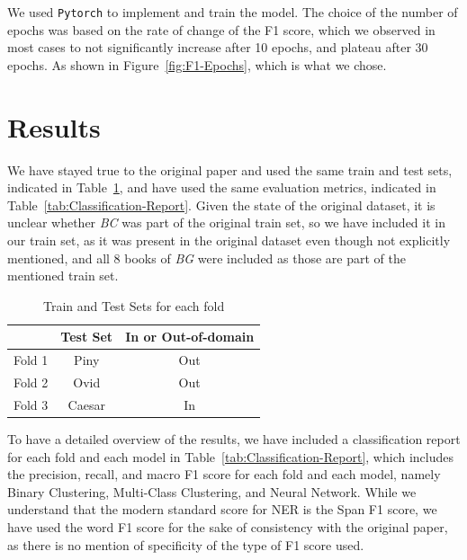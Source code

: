 \documentclass[11pt]{article}
\begin{document}
We used \texttt{Pytorch} to implement and train the model. The choice of the number of epochs was based on the rate of change of the F1 score,
which we observed in most cases to not significantly increase after 10 epochs, and plateau after 30 epochs. As shown in Figure~\ref{fig:F1-Epochs},
which is what we chose.

\section{Results}
We have stayed true to the original paper and used the same train and test sets, indicated in Table~\ref{tab:Train-Test-Sets}, 
and have used the same evaluation metrics, indicated in Table~\ref{tab:Classification-Report}. Given the state of the original dataset, 
it is unclear whether \textit{BC} was part of the original train set, so we have included it in our train set, as it was present in the original
dataset even though not explicitly mentioned, and all 8 books of \textit{BG} were included as those are part of the mentioned train set.

\begin{table}[H]
  \centering
  \begin{tabular}{|l|c|c|}
  \hline
  \textbf{} & \textbf{Test Set} & \textbf{In or Out-of-domain} \\
  \hline
  Fold 1   & Piny & Out \\
  \hline
  Fold 2   & Ovid & Out \\
  \hline
  Fold 3   & Caesar & In \\
  \hline
  \end{tabular}
  \caption{Train and Test Sets for each fold}
  \label{tab:Train-Test-Sets}
\end{table}

To have a detailed overview of the results, we have included a classification report for each fold and each model 
in Table~\ref{tab:Classification-Report}, which includes the precision, recall, and macro F1 score for each fold and each model,
namely Binary Clustering, Multi-Class Clustering, and Neural Network. While we understand that the modern standard score for NER is the
Span F1 score, we have used the word F1 score for the sake of consistency with the original paper, as there is no mention of specificity of the type
of F1 score used.
\end{document}
